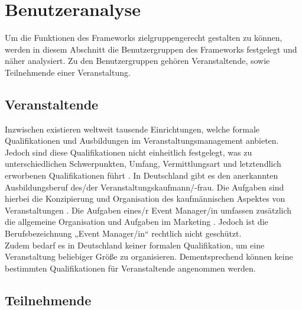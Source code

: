 \section{Benutzeranalyse} \label{sec:analysis-user}

Um die Funktionen des Frameworks zielgruppengerecht gestalten zu können, werden
in diesem Abschnitt die Benutzergruppen des Frameworks festgelegt und näher
analysiert. Zu den Benutzergruppen gehören Veranstaltende, sowie Teilnehmende
einer Veranstaltung.

\subsection{Veranstaltende}





Inzwischen existieren weltweit tausende Einrichtungen, welche formale
Qualifikationen und Ausbildungen im Veranstaltungsmanagement anbieten. Jedoch
sind diese Qualifikationen nicht einheitlich festgelegt, was zu
unterschiedlichen Schwerpunkten, Umfang, Vermittlungsart und letztendlich
erworbenen Qualifikationen führt \cite{Bladen2017}. In Deutschland gibt es den
anerkannten Ausbildungsberuf des/der Veranstaltungs\-kaufmann/-frau. Die
Aufgaben sind hierbei die Konzipierung und Organisation des kaufmännischen
Aspektes von Veranstaltungen \cite{Kultusministerkonferenz2001}. Die Aufgaben
eines/r Event Manager/in umfassen zusätzlich die allgemeine Organisation und
Aufgaben im Marketing \cite{BundesagenturfurArbeit2021}. Jedoch ist die
Berufsbezeichnung „Event Manager/in“ rechtlich nicht geschützt. \\
Zudem bedarf es in Deutschland keiner formalen Qualifikation, um eine
Veranstaltung beliebiger Größe zu organisieren. Dementsprechend können keine
bestimmten Qualifikationen für Veranstaltende angenommen werden.

\subsection{Teilnehmende}

